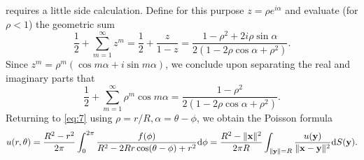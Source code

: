 \begin{sol}
requires a little side calculation.
Define for this purpose $z=\rho e^{i\alpha}$ and evaluate (for $\rho<1$)
the geometric sum
\begin{displaymath}
  \frac{1}{2} + \sum_{m=1}^{\infty}z^m = \frac{1}{2} + \frac{z}{1-z} =
  \frac{1-\rho^2+2i\rho \sin\alpha}{2(1-2\rho\cos\alpha+\rho^2)}.
\end{displaymath}
Since $z^m = \rho^m(\cos m\alpha + i\sin m\alpha)$,
we conclude upon separating the real and imaginary parts that
\begin{displaymath}
  \frac{1}{2} + \sum_{m=1}^{\infty}\rho^m\cos m\alpha =
  \frac{1-\rho^2}{2(1-2\rho\cos\alpha+\rho^2)}.
\end{displaymath}
Returning to \eqref{eq:7} using $\rho=r/R, \alpha=\theta-\phi$,
we obtain the Poisson formula
\begin{displaymath}
  u(r, \theta) = \frac{R^2-r^2}{2\pi}\int_0^{2\pi}\frac{f(\phi)}{R^2-2Rr\cos(\theta-\phi)+r^2}\mathrm{d}\phi = \frac{R^2-\|\mathbf{x}\|^2}{2\pi R}\int_{\|\mathbf{y}\|=R}
    \frac{u(\mathbf{y})}{\|\mathbf{x}-\mathbf{y}\|^2}\mathrm{d} S(\mathbf{y}).
\end{displaymath}
\end{sol}
